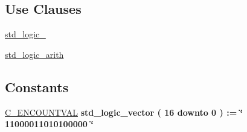 \subsection*{Use Clauses}
 \begin{DoxyCompactItemize}
\item 
\hyperlink{classio__ctrl_1_1rtl_acd03516902501cd1c7296a98e22c6fcb}{std\+\_\+logic\+\_}   
\item 
\hyperlink{classio__ctrl_1_1rtl_a0f5ecc6613f63d07f7963a97b1b26095}{std\+\_\+logic\+\_\+arith}   
\end{DoxyCompactItemize}
\subsection*{Constants}
 \begin{DoxyCompactItemize}
\item 
\hyperlink{classio__ctrl_1_1rtl_a85d68696ce8aad74f4f3f0f5d6cb860a}{C\+\_\+\+E\+N\+C\+O\+U\+N\+T\+V\+AL} {\bfseries \textcolor{comment}{std\+\_\+logic\+\_\+vector}\textcolor{vhdlchar}{ }\textcolor{vhdlchar}{(}\textcolor{vhdlchar}{ }\textcolor{vhdlchar}{ } \textcolor{vhdldigit}{16} \textcolor{vhdlchar}{ }\textcolor{keywordflow}{downto}\textcolor{vhdlchar}{ }\textcolor{vhdlchar}{ } \textcolor{vhdldigit}{0} \textcolor{vhdlchar}{ }\textcolor{vhdlchar}{)}\textcolor{vhdlchar}{ }\textcolor{vhdlchar}{ }\textcolor{vhdlchar}{ }\textcolor{vhdlchar}{\+:}\textcolor{vhdlchar}{=}\textcolor{vhdlchar}{ }\textcolor{vhdlchar}{ }\textcolor{vhdlchar}{ }\textcolor{vhdlchar}{ }\textcolor{keyword}{\char`\"{} 11000011010100000 \char`\"{}}\textcolor{vhdlchar}{ }} 
\end{DoxyCompactItemize}
